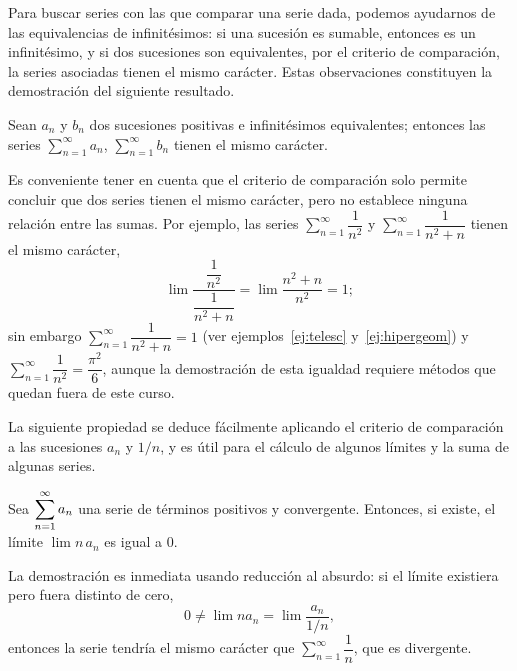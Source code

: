 Para buscar series con las que comparar una serie dada, podemos ayudarnos de las equivalencias de infinitésimos: si una sucesión es sumable, entonces es un infinitésimo, y si dos sucesiones son equivalentes, por el criterio de comparación, la series asociadas tienen el mismo carácter.
Estas observaciones constituyen la demostración del siguiente resultado.

\begin{corolario}
Sean $a_n$ y $b_n$ dos sucesiones positivas e infinitésimos equivalentes; entonces las series $\displaystyle\sum_{n=1}^\infty  a_n$, $\displaystyle\sum_{n=1}^\infty  b_n$ tienen el mismo carácter.
\end{corolario}

Es conveniente tener en cuenta que el criterio de comparación solo permite concluir que dos series tienen el mismo carácter, pero no establece ninguna relación entre las sumas.
Por ejemplo, las series $\displaystyle\sum_{n=1}^\infty  \dfrac1{n^2}$ y $\displaystyle\sum_{n=1}^\infty  \dfrac1{n^2+n}$ tienen el mismo carácter,
\[
\lim\dfrac{\dfrac1{n^2}}{\dfrac1{n^2+n}}=
\lim\dfrac{n^2+n}{n^2}=1;
\]
sin embargo $\displaystyle\sum_{n=1}^\infty  \dfrac1{n^2+n}=1$ (ver ejemplos~\ref{ej:telesc} y~\ref{ej:hipergeom}) y
$\displaystyle\sum_{n=1}^\infty  \dfrac1{n^2}=\dfrac{\pi^2}6$, aunque la demostración de esta igualdad requiere métodos que quedan fuera de este curso.

La siguiente propiedad se deduce fácilmente aplicando el criterio de comparación a las sucesiones $a_n$ y $1/n$, y es útil para el cálculo de algunos límites y la suma de algunas series.

\begin{corolario}\label{cor:limnan}
Sea $\displaystyle\displaystyle\sum_{n=1}^\infty  a_n$ una serie de términos positivos y convergente.
Entonces, si existe, el límite $\lim n\, a_n$ es igual a $0$.
\end{corolario}

La demostración es inmediata usando reducción al absurdo: si el límite existiera pero fuera distinto de cero,
\[
0\ne \lim na_n=\lim \dfrac{a_n}{1/n},
\]
entonces la serie tendría el mismo carácter que $\displaystyle\sum_{n=1}^\infty  \dfrac1n$, que es divergente.


